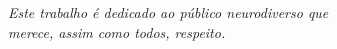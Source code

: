 \begin{dedicatoria}
   \vspace*{\fill}
   \centering
   \noindent
   \textit{ Este trabalho é dedicado ao público neurodiverso que\\
   merece, assim como todos, respeito.} 

   
   \vspace*{\fill}
   

\end{dedicatoria}
